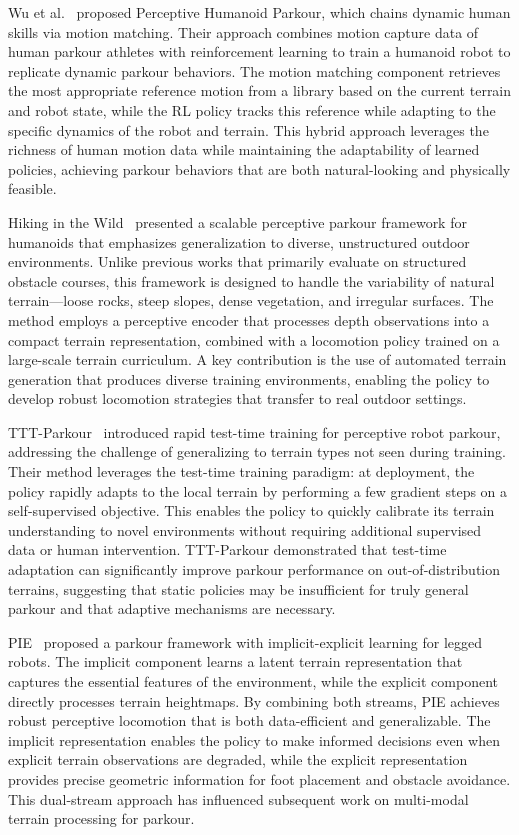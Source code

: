 Wu et al.~\cite{wu2024perceptiveparkour} proposed Perceptive Humanoid Parkour, which chains dynamic human skills via motion matching. Their approach combines motion capture data of human parkour athletes with reinforcement learning to train a humanoid robot to replicate dynamic parkour behaviors. The motion matching component retrieves the most appropriate reference motion from a library based on the current terrain and robot state, while the RL policy tracks this reference while adapting to the specific dynamics of the robot and terrain. This hybrid approach leverages the richness of human motion data while maintaining the adaptability of learned policies, achieving parkour behaviors that are both natural-looking and physically feasible.

Hiking in the Wild~\cite{zhu2024hiking} presented a scalable perceptive parkour framework for humanoids that emphasizes generalization to diverse, unstructured outdoor environments. Unlike previous works that primarily evaluate on structured obstacle courses, this framework is designed to handle the variability of natural terrain---loose rocks, steep slopes, dense vegetation, and irregular surfaces. The method employs a perceptive encoder that processes depth observations into a compact terrain representation, combined with a locomotion policy trained on a large-scale terrain curriculum. A key contribution is the use of automated terrain generation that produces diverse training environments, enabling the policy to develop robust locomotion strategies that transfer to real outdoor settings.

TTT-Parkour~\cite{zhu2024tttparkour} introduced rapid test-time training for perceptive robot parkour, addressing the challenge of generalizing to terrain types not seen during training. Their method leverages the test-time training paradigm: at deployment, the policy rapidly adapts to the local terrain by performing a few gradient steps on a self-supervised objective. This enables the policy to quickly calibrate its terrain understanding to novel environments without requiring additional supervised data or human intervention. TTT-Parkour demonstrated that test-time adaptation can significantly improve parkour performance on out-of-distribution terrains, suggesting that static policies may be insufficient for truly general parkour and that adaptive mechanisms are necessary.

PIE~\cite{luo2024pie} proposed a parkour framework with implicit-explicit learning for legged robots. The implicit component learns a latent terrain representation that captures the essential features of the environment, while the explicit component directly processes terrain heightmaps. By combining both streams, PIE achieves robust perceptive locomotion that is both data-efficient and generalizable. The implicit representation enables the policy to make informed decisions even when explicit terrain observations are degraded, while the explicit representation provides precise geometric information for foot placement and obstacle avoidance. This dual-stream approach has influenced subsequent work on multi-modal terrain processing for parkour.

